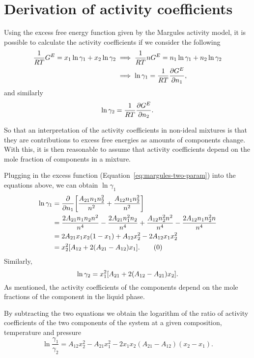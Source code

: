 \section{Derivation of activity coefficients}

Using the excess free energy function given by the Margules activity model, 
it is possible to calculate the activity coefficients if we consider the 
following
\begin{align*}
    \frac1{RT} G^E = x_1\ln\gamma_1 + x_2\ln\gamma_2 &\implies
    \frac1{RT}n G^E = n_1\ln\gamma_1 + n_2\ln\gamma_2 \\ &\implies
    \ln\gamma_1 = \frac1{RT} \pdv{G^E}{n_1},
\end{align*}
and similarly
\[
    \ln\gamma_2 = \frac1{RT} \pdv{G^E}{n_2}.
\]

So that an interpretation of the activity coefficients in non-ideal mixtures is
that they are contributions to excess free energies as amounts of components change.
With this, it is then reasonable to assume that activity coefficients depend on
the mole fraction of components in a mixture.

Plugging in the excess function (Equation~\ref{eq:margules-two-param}) into the
equations above, we can obtain $\ln\gamma_1$
\begin{align*}\label{eq:margules-act-1}
    \ln\gamma_1 &= \pdv{n_1} \qty[\dfrac{A_{21}n_1n_2^2}{n^2} + 
    \dfrac{A_{12}n_1n_2^2}{n^2}] \\
    &= \dfrac{2A_{21}n_1n_2n^2}{n^4} - \dfrac{2A_{21}n_1^2n_2}{n^4} +
    \dfrac{A_{12}n_2^2n^2}{n^4} - \dfrac{2A_{12}n_1n_2^2n}{n^4} \\
    &= 2A_{21}x_1x_2(1-x_1) + A_{12}x_2^2 - 2A_{12}x_1x_2^2 \\
    &= x_2^2 \qty[A_{12} + 2(A_{21} - A_{12})x_1]. \tag{\theequation}
\end{align*}
Similarly,
\begin{equation}\label{eq:margules-act-2}
    \ln\gamma_2 = x_1^2 \qty[A_{21} + 2(A_{12} - A_{21})x_2].
\end{equation}
As mentioned, the activity coefficients of the components depend on the mole 
fractions of the component in the liquid phase.

By subtracting the two equations we obtain the logarithm of the ratio of activity
coefficients of the two components of the system at a given composition, temperature
and pressure
\begin{equation}\label{eq:act-diff}
    \ln\dfrac{\gamma_1}{\gamma_2} = A_{12}x_2^2 - A_{21}x_1^2 - 2x_1x_2
    (A_{21} - A_{12})(x_2 - x_1).
\end{equation}

